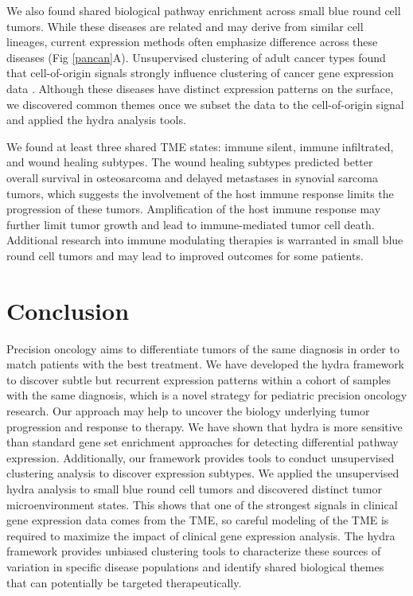 \documentclass[10pt,letterpaper]{article}
\begin{document}
We also found shared biological pathway enrichment across small blue round cell tumors. While these diseases are related and may derive from similar cell lineages, current expression methods often emphasize difference across these diseases (Fig \ref{pancan}A). Unsupervised clustering of adult cancer types found that cell-of-origin signals strongly influence clustering of cancer gene expression data \cite{hoadleyCellofOriginPatternsDominate2018}. Although these diseases have distinct expression patterns on the surface, we discovered common themes once we subset the data to the cell-of-origin signal and applied the hydra analysis tools. 

We found at least three shared TME states: immune silent, immune infiltrated, and wound healing subtypes. The wound healing subtypes predicted better overall survival in osteosarcoma and delayed metastases in synovial sarcoma tumors, which suggests the involvement of the host immune response limits the progression of these tumors. Amplification of the host immune response may further limit tumor growth and lead to immune-mediated tumor cell death. Additional research into immune modulating therapies is warranted in small blue round cell tumors and may lead to improved outcomes for some patients.

\section*{Conclusion}
Precision oncology aims to differentiate tumors of the same diagnosis in order to match patients with the best treatment. We have developed the hydra framework to discover subtle but recurrent expression patterns within a cohort of samples with the same diagnosis, which is a novel strategy for pediatric precision oncology research. Our approach may help to uncover the biology underlying tumor progression and response to therapy. We have shown that hydra is more sensitive than standard gene set enrichment approaches for detecting differential pathway expression. Additionally, our framework provides tools to conduct unsupervised clustering analysis to discover expression subtypes. We applied the unsupervised hydra analysis to small blue round cell tumors and discovered distinct tumor microenvironment states. This shows that one of the strongest signals in clinical gene expression data comes from the TME, so careful modeling of the TME is required to maximize the impact of clinical gene expression analysis. The hydra framework provides unbiased clustering tools to characterize these sources of variation in specific disease populations and identify shared biological themes that can potentially be targeted therapeutically.
\end{document}
